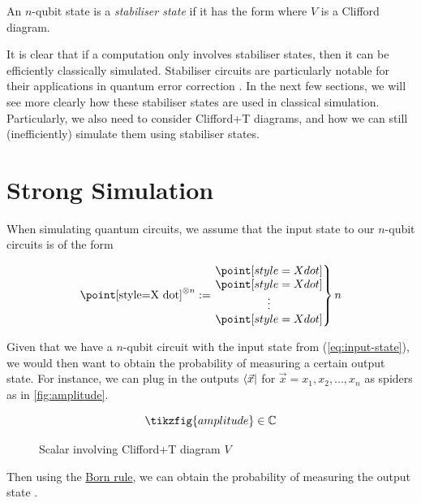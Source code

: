 \begin{definition}
    \label{def:stabiliser-state}
    An $n$-qubit state \ket{\psi} is a \textit{stabiliser state} if it has the form 
    where $V$ is a Clifford diagram.
\end{definition}

It is clear that if a computation only involves stabiliser states,
then it can be efficiently classically simulated.
Stabiliser circuits are particularly notable for their applications in quantum error correction \cite{gottesman1998}. 
In the next few sections, we will see more clearly how these stabiliser states are used in classical simulation.
Particularly, we also need to consider Clifford+T diagrams,
and how we can still (inefficiently) simulate them using stabiliser states.


\section{Strong Simulation}

When simulating quantum circuits, 
we assume that the input state to our $n$-qubit circuits is of the form

\begin{equation}
\label{eq:input-state}
\cbox{\redbasisspider}^{\otimes n} :=
\left.\begin{matrix}
    \redbasisspider \\
    \redbasisspider \\
    \vdots \\
    \redbasisspider
\end{matrix} \right\} n
\end{equation}

Given that we have a $n$-qubit circuit with the input state from (\ref{eq:input-state}), 
we would then want to obtain the probability of measuring a certain output state.
For instance, we can plug in the outputs $\left\langle \vec{x} \right|$ for $\vec{x}=x_1,x_2,...,x_n$ 
as spiders as in \autoref{fig:amplitude}.

\begin{figure}[h!]
    \[\tikzfig{amplitude} \in \C\]
    \caption{Scalar involving Clifford+T diagram $V$}
    \label{fig:amplitude}
\end{figure}

Then using the \hyperref[eq:born-rule]{Born rule}, 
we can obtain the probability of measuring the output state \cite{Kissinger2024}.

